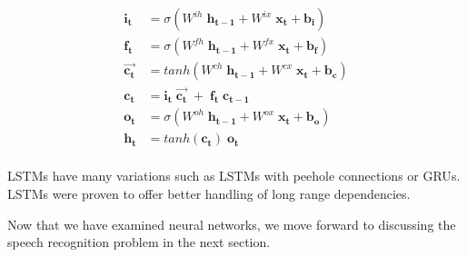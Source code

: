 \begin{align}
	\mathbf{i_t } & = \sigma(W^{ih} \; \mathbf{h_{t-1}} + W^{ix}\; \mathbf{x_t}  + \mathbf{b_i}) \label{eq:100} \\ 
	\mathbf{f_t} & = \sigma(W^{fh}\;\mathbf{h_{t-1}}  + W^{fx} \; \mathbf{x_t}  + \mathbf{b_f}) \label{eq:101} \\
	\mathbf{\vec{c_t}} & = tanh(W^{ch} \; \mathbf{h_{t-1}} + W^{cx}\; \mathbf{x_t} + \mathbf{b_c}) \label{eq:102} \\
	\mathbf{c_t} & = \mathbf{i_t } \; \mathbf{\vec{c_t}} \; + \;  \mathbf{f_t} \; \mathbf{c_{t-1}} \label{eq:103} \\
	\mathbf{o_t} & = \sigma(W^{oh} \; \mathbf{h_{t-1}} + W^{ox}\; \mathbf{x_t} + \mathbf{b_o}) \label{eq:104} \\
	\mathbf{h_t} & = tanh(\mathbf{c_t}) \; \mathbf{o_t} \label{eq:105}  \\
\end{align}





\ac{LSTM}s have many variations such as \ac{LSTM}s with peehole connections or \ac{GRU}s. \ac{LSTM}s were proven to offer better handling of long range dependencies.











Now that we have examined neural networks, we move forward to discussing the speech recognition problem in the next section.




















